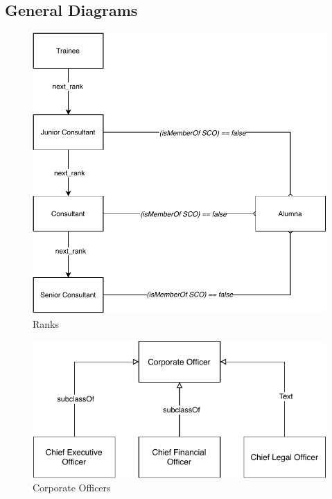 \documentclass[a4paper, DIV=13, BCOR=0cm]{scrbook}
\begin{document}
\subsection{General Diagrams}
\begin{figure}[h]
	\caption{Ranks}
	\centering
	\includegraphics[width=\textwidth]{Diagrams/ranks.pdf}
\end{figure}

\begin{figure}[h]
	\caption{Corporate Officers}
	\centering
	\includegraphics[width=\textwidth]{Diagrams/corporate-officers.pdf}
\end{figure}
\end{document}
